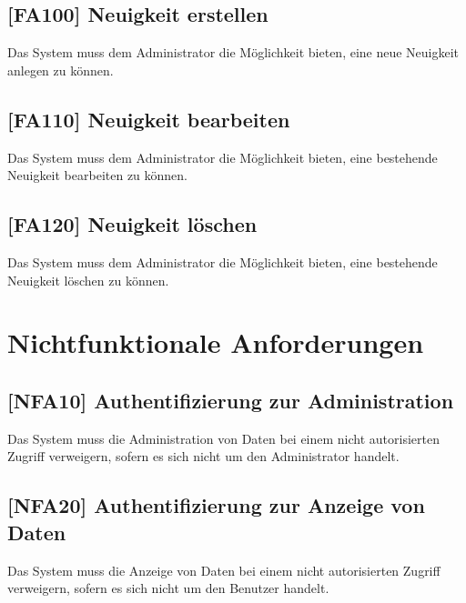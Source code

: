 \subsection{[FA100] Neuigkeit erstellen} \label{fa100}
Das System muss dem Administrator die Möglichkeit bieten, eine neue Neuigkeit anlegen zu können.

\subsection{[FA110] Neuigkeit bearbeiten} \label{fa110}
Das System muss dem Administrator die Möglichkeit bieten, eine bestehende Neuigkeit bearbeiten zu können.

\subsection{[FA120] Neuigkeit löschen} \label{fa120}
Das System muss dem Administrator die Möglichkeit bieten, eine bestehende Neuigkeit löschen zu können.

\newpage

\section{Nichtfunktionale Anforderungen}

\subsection{[NFA10] Authentifizierung zur Administration} \label{nfa10}
Das System muss die Administration von Daten bei einem nicht autorisierten Zugriff verweigern, sofern es sich nicht um den Administrator handelt.

\subsection{[NFA20] Authentifizierung zur Anzeige von Daten} \label{nfa20}
Das System muss die Anzeige von Daten bei einem nicht autorisierten Zugriff verweigern, sofern es sich nicht um den Benutzer handelt.